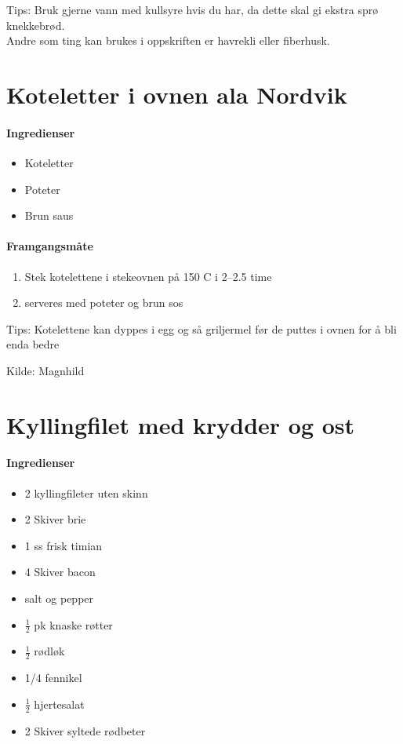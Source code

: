 \documentclass[12pt,a4paper]{book}
\begin{document}
{Tips: Bruk gjerne vann med kullsyre hvis du har, da dette skal gi ekstra sprø knekkebrød. \\ Andre som ting kan brukes i oppskriften er havrekli eller fiberhusk.
\clearpage{}
\clearpage{}\section{﻿Koteletter i ovnen ala Nordvik}


\paragraph{Ingredienser}
\begin{itemize}[noitemsep]
	\item Koteletter
	\item Poteter
	\item Brun saus
\end{itemize}

\paragraph{Framgangsmåte}
\begin{enumerate}[noitemsep]
	\item Stek kotelettene i stekeovnen på 150 \degree C i 2--2.5 time
	\item serveres med poteter og brun sos
\end{enumerate}

Tips: Kotelettene kan dyppes i egg og så griljermel før de puttes i ovnen for å bli enda bedre

Kilde: Magnhild
\clearpage{}
\clearpage{}\section{﻿Kyllingfilet med krydder og ost}


\paragraph{Ingredienser}
\begin{itemize}[noitemsep]
	\item 2 kyllingfileter uten skinn
	\item 2 Skiver  brie
	\item 1 ss frisk timian
	\item 4 Skiver bacon
	\item salt og pepper
	\item $\frac{1}{2}$  pk knaske røtter
	\item $\frac{1}{2}$  rødløk
	\item 1/4 fennikel
	\item $\frac{1}{2}$  hjertesalat
	\item 2 Skiver syltede rødbeter
\end{itemize}

}
\end{document}
